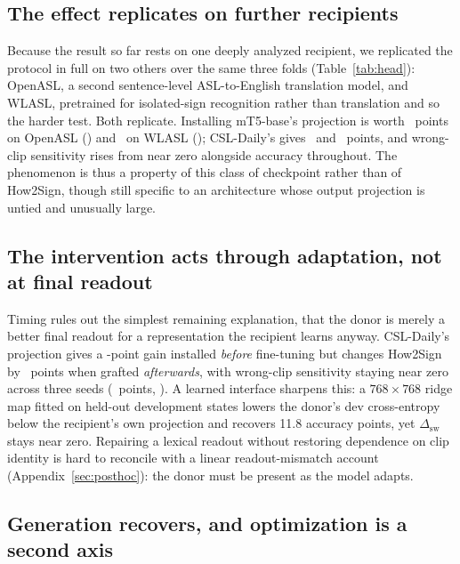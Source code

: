 \documentclass[11pt]{article}
\begin{document}
\subsection{The effect replicates on further recipients}
\label{sec:generality}

Because the result so far rests on one deeply analyzed recipient, we replicated
the protocol in full on two others over the same three folds
(Table~\ref{tab:head}): OpenASL, a second sentence-level ASL-to-English
translation model, and WLASL, pretrained for isolated-sign recognition rather
than translation and so the harder test. Both replicate. Installing mT5-base's
projection is worth \HeadBaseGainOpenLexDeltaAbs\ points on OpenASL
(\HeadBaseGainOpenLexCI) and \HeadBaseGainWlaslLexDeltaAbs\ on WLASL
(\HeadBaseGainWlaslLexCI); CSL-Daily's gives \HeadCslGainOpenLexDeltaAbs\ and
\HeadCslGainWlaslLexDeltaAbs\ points, and wrong-clip sensitivity rises from near
zero alongside accuracy throughout. The phenomenon is thus a property of this
class of checkpoint rather than of How2Sign, though still specific to an
architecture whose output projection is untied and unusually large.

\subsection{The intervention acts through adaptation, not at final readout}
\label{sec:posthocmain}

Timing rules out the simplest remaining explanation, that the donor is merely a
better final readout for a representation the recipient learns anyway.
CSL-Daily's projection gives a \HeadHowCslLexGapAbs-point gain installed
\emph{before} fine-tuning but changes How2Sign by \PostHowCslPostDelta\ points
when grafted \emph{afterwards}, with wrong-clip sensitivity staying near zero
across three seeds (\PostHowCslLexSwapDelta\ points, \PostHowCslSwapCI). A
learned interface sharpens this: a $768\times768$ ridge map fitted on held-out
development states lowers the donor's dev cross-entropy below the recipient's own
projection and recovers 11.8 accuracy points, yet $\Delta_{\mathrm{sw}}$ stays
near zero. Repairing a lexical readout without restoring dependence on clip
identity is hard to reconcile with a linear readout-mismatch account
(Appendix~\ref{sec:posthoc}): the donor must be present as the model adapts.

\subsection{Generation recovers, and optimization is a second axis}
\label{sec:optim}
\end{document}
